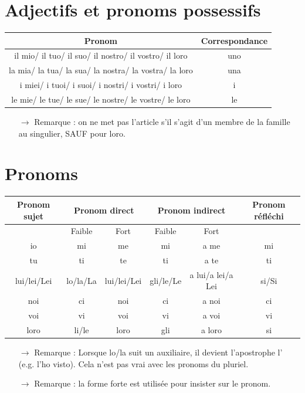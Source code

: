 \documentclass[12pt, openany]{report}
\begin{document}
\section{Adjectifs et pronoms possessifs}
\begin{center}
    \begin{tabular}{c|c}
        Pronom & Correspondance\\ \hline
        il mio/ il tuo/ il suo/ il nostro/ il vostro/ il loro & uno \\
        la mia/ la tua/ la sua/ la nostra/ la vostra/ la loro & una\\
        i miei/ i tuoi/ i suoi/ i nostri/ i vostri/ i loro & i\\
        le mie/ le tue/ le sue/ le nostre/ le vostre/ le loro & le\\
    \end{tabular}
\end{center}
\begin{itemize}
    \item [$\rightarrow$] Remarque : on ne met pas l'article s'il s'agit d'un membre de la famille au singulier, SAUF pour loro. 
\end{itemize}
\section{Pronoms}
\begin{center}
    \begin{tabular}{c|c|c|c|c|c}
        Pronom sujet & \multicolumn{2}{c|}{Pronom direct} & \multicolumn{2}{c|}{Pronom indirect} & Pronom réfléchi \\ \hline 
        & Faible & Fort & Faible & Fort & \\ \hline 
        io & mi & me & mi & a me & mi\\
        tu & ti & te & ti & a te & ti\\
        lui/lei/Lei & lo/la/La & lui/lei/Lei & gli/le/Le & a lui/a lei/a Lei & si/Si\\
        noi & ci & noi & ci & a noi & ci\\
        voi & vi & voi & vi & a voi & vi\\
        loro & li/le & loro & gli & a loro & si\\
    \end{tabular}
\end{center}
\begin{itemize}
    \item [$\to$] Remarque : Lorsque lo/la suit un auxiliaire, il devient l'apostrophe l' (e.g. l'ho visto). Cela n'est pas vrai avec les pronoms du pluriel.
    \item [$\to$] Remarque : la forme forte est utilisée pour insister sur le pronom.
\end{itemize}
\end{document}
